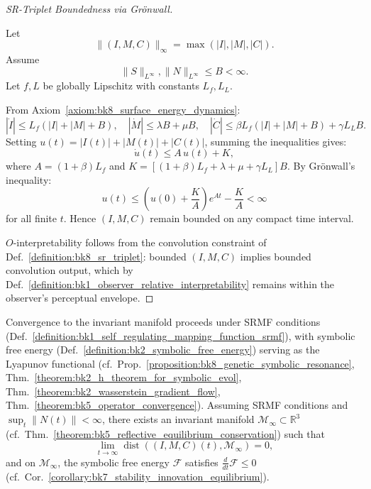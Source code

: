 \begin{proof}[SR-Triplet Boundedness via Grönwall]
\label{proof:bk8_sketch_observer_interoperability}
\leavevmode

Let
\[
\|(I,M,C)\|_\infty = \max(|I|,|M|,|C|).
\]
Assume
\[
\|S\|_{L^\infty}, \|N\|_{L^\infty} \leq B < \infty.
\]
Let $f, L$ be globally Lipschitz with constants $L_f, L_L$.

From Axiom~\ref{axiom:bk8_surface_energy_dynamics}:
\[
|\dot{I}| \leq L_f(|I|+|M|+B),\quad
|\dot{M}| \leq \lambda B + \mu B,\quad
|\dot{C}| \leq \beta L_f(|I|+|M|+B) + \gamma L_L B.
\]
Setting $u(t) = |I(t)| + |M(t)| + |C(t)|$, summing the inequalities gives:
\[
\dot{u}(t) \leq A\,u(t) + K,
\]
where $A = (1+\beta)L_f$ and $K = [(1+\beta)L_f + \lambda + \mu + \gamma L_L]B$.
By Grönwall’s inequality:
\[
u(t) \leq \left(u(0) + \frac{K}{A}\right)e^{At} - \frac{K}{A} < \infty
\]
for all finite $t$. Hence $(I,M,C)$ remain bounded on any compact time interval.

$O$-interpretability follows from the convolution constraint of
Def.~\ref{definition:bk8_sr_triplet}: bounded $(I,M,C)$ implies bounded
convolution output, which by
Def.~\ref{definition:bk1_observer_relative_interpretability} remains within the
observer’s perceptual envelope.
\end{proof}
\begin{theorem}[SR Convergence]
\label{theorem:bk8_sr_convergence}
Convergence to the invariant manifold proceeds under SRMF conditions (Def.~\ref{definition:bk1_self_regulating_mapping_function_srmf}), with symbolic free energy (Def.~\ref{definition:bk2_symbolic_free_energy}) serving as the Lyapunov functional (cf.~Prop.~\ref{proposition:bk8_genetic_symbolic_resonance}, Thm.~\ref{theorem:bk2_h_theorem_for_symbolic_evol}, Thm.~\ref{theorem:bk2_wasserstein_gradient_flow}, Thm.~\ref{theorem:bk5_operator_convergence}).
Assuming SRMF conditions and \( \sup_t \| N(t) \| < \infty \), there exists an invariant manifold \( \mathcal{M}_\infty \subset \mathbb{R}^3 \) (cf.~Thm.~\ref{theorem:bk5_reflective_equilibrium_conservation}) such that
\[
\lim_{t \to \infty} \operatorname{dist}((I, M, C)(t), \mathcal{M}_\infty) = 0,
\]
and on \( \mathcal{M}_\infty \), the symbolic free energy \( \mathcal{F} \) satisfies \( \frac{d}{dt} \mathcal{F} \leq 0 \) (cf.~Cor.~\ref{corollary:bk7_stability_innovation_equilibrium}).
\end{theorem}
